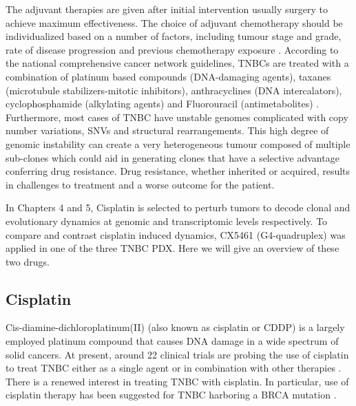 The adjuvant therapies are given after initial intervention usually surgery to achieve maximum effectiveness. The choice of adjuvant chemotherapy should be individualized based on a number of factors, including tumour stage and grade, rate of disease progression and previous chemotherapy exposure \cite{cardoso20173rd,partridge2014chemotherapy}. According to the national comprehensive cancer network guidelines, TNBCs are treated with a combination of platinum based compounds (DNA-damaging agents), taxanes (microtubule stabilizers-mitotic inhibitors), anthracyclines (DNA intercalators), cyclophosphamide (alkylating agents) and Fluorouracil (antimetabolites) \cite{daly2020nccn}.
Furthermore, most cases of TNBC have unstable genomes complicated with copy number variations, SNVs and structural rearrangements. This high degree of genomic instability can create a very heterogeneous tumour composed of multiple sub-clones which could aid in generating clones that have a selective advantage conferring drug resistance. Drug resistance, whether inherited or acquired, results in challenges to treatment and a worse outcome for the patient.

In Chapters 4 and 5, Cisplatin is selected to perturb tumors to decode clonal and evolutionary dynamics at genomic and transcriptomic levels respectively. To compare and contrast cisplatin induced dynamics, CX5461 (G4-quadruplex) was applied in one of the three TNBC PDX. Here we will give an overview of these two drugs.


\subsection{Cisplatin}
Cis-diamine-dichloroplatinum(II) (also known as cisplatin or CDDP) is a largely employed platinum compound that causes DNA damage in  a wide spectrum of solid cancers.  At present, around 22 clinical trials are probing the use of cisplatin to treat TNBC either as a single agent or in combination with other therapies \cite{us2017clinicaltrials}.
There is a renewed interest in treating TNBC with cisplatin.
In particular, use of cisplatin therapy has been suggested for TNBC harboring a BRCA mutation \cite{caparica2019treat,petrelli2016platinum}. 

